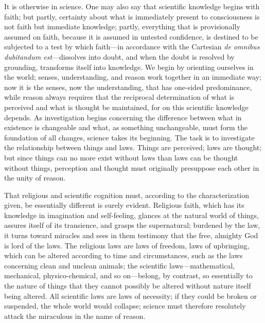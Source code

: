 \documentclass[12pt,a4paper]{article}
\begin{document}
It is otherwise in science. One may also say that scientific knowledge
begins with faith; but partly, certainty about what is immediately
present to consciousness is not faith but immediate knowledge; partly,
everything that is provisionally assumed on faith, because it is
assumed in untested confidence, is destined to be subjected to a test
by which faith---in accordance with the Cartesian \emph{de omnibus
dubitandum est}---dissolves into doubt, and when the doubt is resolved
by grounding, transforms itself into knowledge. We begin by orienting
ourselves in the world; senses, understanding, and reason work together
in an immediate way; now it is the senses, now the understanding, that
has one-sided predominance, while reason always requires that the
reciprocal determination of what is perceived and what is thought be
maintained, for on this scientific knowledge depends. As investigation
begins concerning the difference between what in existence is changeable
and what, as something unchangeable, must form the foundation of all
changes, science takes its beginning. The task is to investigate the
relationship between things and laws. Things are perceived; laws are
thought; but since things can no more exist without laws than laws can
be thought without things, perception and thought must originally
presuppose each other in the unity of reason.

That religious and scientific cognition must, according to the
characterization given, be essentially different is surely evident.
Religious faith, which has its knowledge in imagination and
self-feeling, glances at the natural world of things, assures itself of
its transience, and grasps the supernatural; burdened by the law, it
turns toward miracles and sees in them testimony that the free,
almighty God is lord of the laws. The religious laws are laws of
freedom, laws of upbringing, which can be altered according to time and
circumstances, such as the laws concerning clean and unclean animals;
the scientific laws---mathematical, mechanical, physico-chemical, and
so on---belong, by contrast, so essentially to the nature of things
that they cannot possibly be altered without nature itself being
altered. All scientific laws are laws of necessity; if they could be
broken or suspended, the whole world would collapse; science must
therefore resolutely attack the miraculous in the name of reason.
\end{document}
